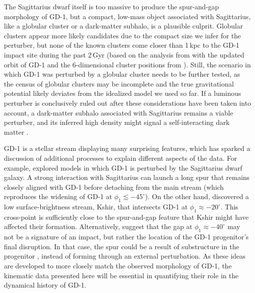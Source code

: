 \documentclass[twocolumn]{aastex63}
\begin{document}
The Sagittarius dwarf itself is too massive to produce the spur-and-gap morphology of GD-1, but a compact, low-mass object associated with Sagittarius, like a globular cluster or a dark-matter subhalo, is a plausible culprit.
Globular clusters appear more likely candidates due to the compact size we infer for the perturber, but none of the known clusters come closer than 1\,kpc to the GD-1 impact site during the past 2\,Gyr (based on the analysis from \citealt{bonaca2019a} with the updated orbit of GD-1 and the 6-dimensional cluster positions from \citealt{baumgardt2019}).
Still, the scenario in which GD-1 was perturbed by a globular cluster needs to be further tested, as the census of globular clusters may be incomplete and the true gravitational potential likely deviates from the idealized model we used so far.
If a luminous perturber is conclusively ruled out after these considerations have been taken into account, a dark-matter subhalo associated with Sagittarius remains a viable perturber, and its inferred high density might signal a self-interacting dark matter \citep[e.g.,][]{kahlhoefer2019}.

GD-1 is a stellar stream displaying many surprising features, which has sparked a discussion of additional processes to explain different aspects of the data.
For example, \citet{deboer2019} explored models in which GD-1 is perturbed by the Sagittarius dwarf galaxy.
A strong interaction with Sagittarius can launch a long spur that remains closely aligned with GD-1 before detaching from the main stream (which reproduces the widening of GD-1 at $\phi_1\lesssim-45^\circ$).
On the other hand, \citet{malhan2019c} discovered a low surface-brightness stream, Kshir, that intersects GD-1 at $\phi_1\approx-20^\circ$.
This cross-point is sufficiently close to the spur-and-gap feature that Kshir might have affected their formation.
Alternatively, \citet{webb2019} suggest that the gap at $\phi_1\approx-40^\circ$ may not be a signature of an impact, but rather the location of the GD-1 progenitor's final disruption.
In that case, the spur could be a result of substructure in the progenitor \citep[e.g.,][]{carlberg2018}, instead of forming through an external perturbation.
As these ideas are developed to more closely match the observed morphology of GD-1, the kinematic data presented here will be essential in quantifying their role in the dynamical history of GD-1.

\end{document}
